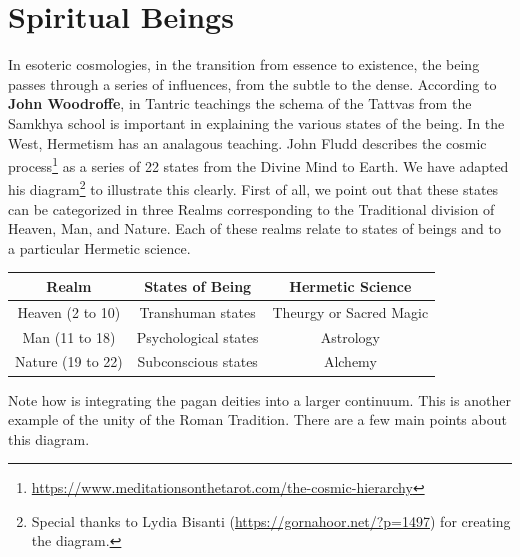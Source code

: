 \section{Spiritual Beings}

In esoteric cosmologies, in the transition from essence to existence, the being passes through a series of influences, from the subtle to the dense. According to \textbf{John Woodroffe}, in Tantric teachings the schema of the Tattvas from the Samkhya school is important in explaining the various states of the being. In the West, Hermetism has an analagous teaching. John Fludd describes the cosmic process\footnote{\url{https://www.meditationsonthetarot.com/the-cosmic-hierarchy}} as a series of 22 states from the Divine Mind to Earth. We have adapted his diagram\footnote{Special thanks to Lydia Bisanti (\url{https://gornahoor.net/?p=1497}) for creating the diagram.} to illustrate this clearly. First of all, we point out that these states can be categorized in three Realms corresponding to the Traditional division of Heaven, Man, and Nature. Each of these realms relate to states of beings and to a particular Hermetic science.

\begin{table}[h]\small\centering
\begin{tabular}{ccc}\toprule
\textbf{Realm} & \textbf{States of Being} & \textbf{Hermetic Science} \\\midrule
Heaven (2 to 10) & Transhuman states & Theurgy or Sacred Magic \\
Man (11 to 18) & Psychological states & Astrology \\
Nature (19 to 22) & Subconscious states & Alchemy \\\bottomrule
\end{tabular}
\end{table}

Note how is integrating the pagan deities into a larger continuum. This is another example of the unity of the Roman Tradition. There are a few main points about this diagram.

